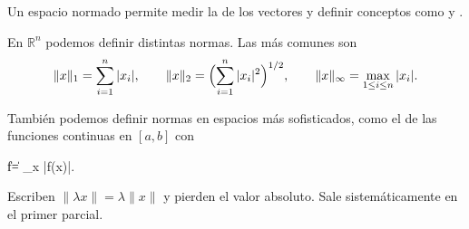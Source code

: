 \begin{frame}

Un espacio normado permite medir la  de los vectores y
definir conceptos como  y .

\dpause

\begin{example}
En $\mathbb{R}^n$ podemos definir distintas normas. Las más comunes son
\[
  \|x\|_1 = \sum_{i=1}^n |x_i|,
  \qquad
  \|x\|_2 = \Bigl(\sum_{i=1}^n |x_i|^2\Bigr)^{1/2},
  \qquad
  \|x\|_\infty = \max_{1 \leq i \leq n} |x_i|.
\]


También podemos definir normas en espacios más sofisticados, como el de las
funciones continuas en $[a,b]$ con
\begin{keyformula}
  \|f\| = \max_{x \in [a,b]} |f(x)|.
\end{keyformula}
\end{example}

\begin{commonmistake}
Escriben $\|\lambda x\| = \lambda \|x\|$ y pierden el valor absoluto. Sale
sistemáticamente en el primer parcial.
\end{commonmistake}
\end{frame}
